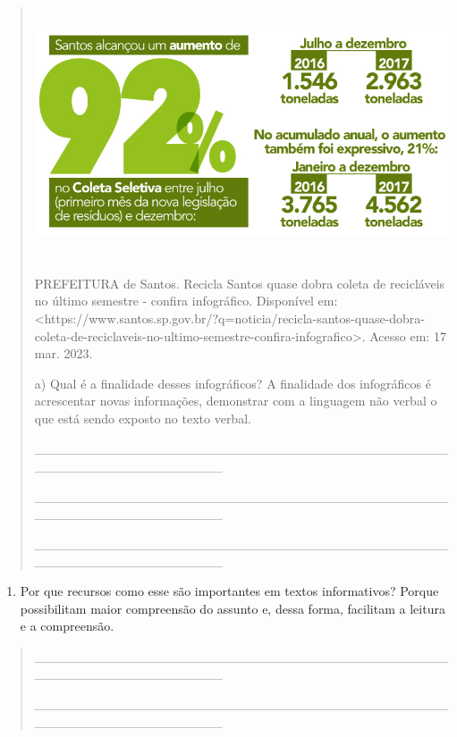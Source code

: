\begin{escolha}
\begin{escolha}
{\begin{quote}
\includegraphics[width=5.90556in,height=2.92847in]{media/image31.jpeg}

PREFEITURA de Santos. Recicla Santos quase dobra coleta de recicláveis
no último semestre - confira infográfico. Disponível em:
\textless{}https://www.santos.sp.gov.br/?q=noticia/recicla-santos-quase-dobra-coleta-de-reciclaveis-no-ultimo-semestre-confira-infografico\textgreater{}.
Acesso em: 17 mar. 2023.

a) Qual é a finalidade desses infográficos? A finalidade dos
infográficos é acrescentar novas informações, demonstrar com a linguagem
não verbal o que está sendo exposto no texto verbal.

\_\_\_\_\_\_\_\_\_\_\_\_\_\_\_\_\_\_\_\_\_\_\_\_\_\_\_\_\_\_\_\_\_\_\_\_\_\_\_\_\_\_\_\_\_\_\_\_\_\_\_\_\_\_\_\_\_\_\_\_\_\_\_\_

\_\_\_\_\_\_\_\_\_\_\_\_\_\_\_\_\_\_\_\_\_\_\_\_\_\_\_\_\_\_\_\_\_\_\_\_\_\_\_\_\_\_\_\_\_\_\_\_\_\_\_\_\_\_\_\_\_\_\_\_\_\_\_\_

\_\_\_\_\_\_\_\_\_\_\_\_\_\_\_\_\_\_\_\_\_\_\_\_\_\_\_\_\_\_\_\_\_\_\_\_\_\_\_\_\_\_\_\_\_\_\_\_\_\_\_\_\_\_\_\_\_\_\_\_\_\_\_\_
\end{quote}

\begin{enumerate}
\def\labelenumi{\alph{enumi})}
\item
  Por que recursos como esse são importantes em textos informativos?
  Porque possibilitam maior compreensão do assunto e, dessa forma,
  facilitam a leitura e a compreensão.
\end{enumerate}

\begin{quote}
\_\_\_\_\_\_\_\_\_\_\_\_\_\_\_\_\_\_\_\_\_\_\_\_\_\_\_\_\_\_\_\_\_\_\_\_\_\_\_\_\_\_\_\_\_\_\_\_\_\_\_\_\_\_\_\_\_\_\_\_\_\_\_\_

\_\_\_\_\_\_\_\_\_\_\_\_\_\_\_\_\_\_\_\_\_\_\_\_\_\_\_\_\_\_\_\_\_\_\_\_\_\_\_\_\_\_\_\_\_\_\_\_\_\_\_\_\_\_\_\_\_\_\_\_\_\_\_\_


\end{quote}}
\end{escolha}
\end{escolha}
